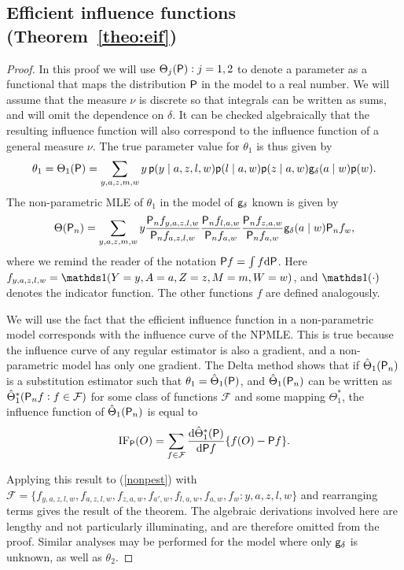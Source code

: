 \subsection{Efficient influence functions (Theorem~\ref{theo:eif})}
\begin{proof}
  In this proof we will use $\Theta_j(\P):j=1,2$ to denote a parameter
  as a functional that maps the distribution $\P$ in the model to a
  real number. We will assume that the measure $\nu$ is discrete so
  that integrals can be written as sums, and will omit the dependence
  on $\delta$. It can be checked algebraically that the resulting
  influence function will also correspond to the influence function of
  a general measure $\nu$. The true parameter value for $\theta_1$ is
  thus given by
  \[\theta_1=\Theta_1(\P) = \sum_{y,a,z,m,w} y\,\p(y\mid a, z, l,
    w)\p(l\mid a,w)\p(z\mid a,w)\g_\delta(a\mid w)\p(w).\] The
  non-parametric MLE of $\theta_1$ in the model of $\g_\delta$ known
  is given by
  \begin{equation}
    \Theta(\Pn)=\sum_{y,a,z,m,w}y\frac{\Pn f_{y,a,z,l,w}}{\Pn
      f_{a,z,l,w}}\frac{\Pn f_{l,a,w}}{\Pn f_{a,w}}\frac{\Pn
      f_{z,a,w}}{\Pn f_{a,w}}\g_{\delta}(a\mid w)\Pn f_w\label{nonpest},
  \end{equation}
  where we remind the reader of the notation $\P f =\int f \dd\P$. Here
  $f_{y,a,z,l,w}=\one(Y=y,A=a,Z=z,M=m,W=w)$, and $\one(\cdot)$ denotes
  the indicator function. The other functions $f$ are defined
  analogously.

  We will use the fact that the efficient influence function in a
  non-parametric model corresponds with the influence curve of the
  NPMLE. This is true because the influence curve of any regular
  estimator is also a gradient, and a non-parametric model has only
  one gradient. The Delta method \cite[see, e.g., Appendix 18
  of][]{vdl2011targeted} shows that if $\hat \Theta_1(\Pn)$ is a
  substitution estimator such that $\theta_1=\hat \Theta_1(\P)$, and
  $\hat \Theta_1(\Pn)$ can be written as
  $\hat \Theta^*_1(\Pn f:f\in\mathcal{F})$ for some class of functions
  $\mathcal{F}$ and some mapping $\Theta^*_1$, the influence function of
  $\hat \Theta_1(\Pn)$ is equal to
  \[\dr_\P(O)=\sum_{f\in\mathcal{F}}\frac{\dd\hat \Theta^*_1(\P)}
  {\dd\P f}\{f(O)-\P f\}.\]

  Applying this result to (\ref{nonpest}) with
  $\mathcal{F}=\{f_{y,a,z,l,w},f_{a,z,l,w},f_{z,a,w},f_{a',w},
  f_{l,a,w},f_{a,w},f_w:y,a,z,l,w\}$ and rearranging terms gives the result of
  the theorem. The algebraic derivations involved here are lengthy and not
  particularly illuminating, and are therefore omitted from the proof. Similar
  analyses may be performed for the model where only $\g_\delta$ is unknown, as
  well as $\theta_2$.
\end{proof}

